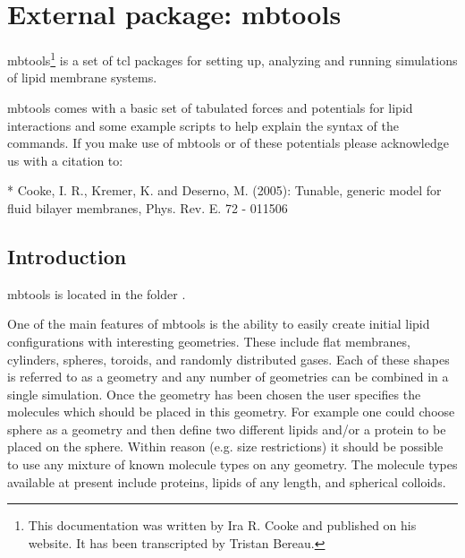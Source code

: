 %  
%   
%  
%  
%
\chapter{External package: mbtools}
\label{chap:mbtools}


mbtools\footnote{This documentation was written by Ira R. Cooke and
  published on his website. It has been transcripted by Tristan
  Bereau.} is a set of tcl packages for setting up, analyzing and
running simulations of lipid membrane systems.

mbtools comes with a basic set of tabulated forces and potentials for
lipid interactions and some example scripts to help explain the syntax
of the commands. If you make use of mbtools or of these potentials
please acknowledge us with a citation to:

* Cooke, I. R., Kremer, K. and Deserno, M. (2005): Tunable, generic
model for fluid bilayer membranes, Phys. Rev. E. 72 - 011506

\section{Introduction}

mbtools is located in the folder .

One of the main features of mbtools is the ability to easily create
initial lipid configurations with interesting geometries. These
include flat membranes, cylinders, spheres, toroids, and randomly
distributed gases. Each of these shapes is referred to as a geometry
and any number of geometries can be combined in a single
simulation. Once the geometry has been chosen the user specifies the
molecules which should be placed in this geometry. For example one
could choose sphere as a geometry and then define two different lipids
and/or a protein to be placed on the sphere. Within reason (e.g. size
restrictions) it should be possible to use any mixture of known
molecule types on any geometry. The molecule types available at
present include proteins, lipids of any length, and spherical
colloids.

